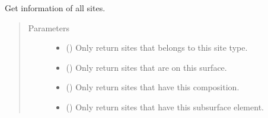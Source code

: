 \documentclass[letterpaper,10pt,english]{sphinxmanual}
\begin{document}
\begin{fulllineitems}
\begin{fulllineitems}
\begin{quote}
\begin{description}
\end{description}\end{quote}

\end{fulllineitems}


\begin{fulllineitems}
\label{\detokenize{modules:acat.adsorption_sites.SlabAdsorptionSites.get_sites}}
Get information of all sites.
\begin{quote}\begin{description}
\item[{Parameters}] \leavevmode\begin{itemize}
\item {} 
 (\sphinxstyleliteralemphasis{\sphinxupquote{, }}) \textendash{} Only return sites that belongs to this site type.

\item {} 
 (\sphinxstyleliteralemphasis{\sphinxupquote{, }}) \textendash{} Only return sites that are on this surface.

\item {} 
 (\sphinxstyleliteralemphasis{\sphinxupquote{, }}) \textendash{} Only return sites that have this composition.

\item {} 
 (\sphinxstyleliteralemphasis{\sphinxupquote{, }}) \textendash{} Only return sites that have this subsurface element.


\end{itemize}
\end{description}
\end{quote}
\end{fulllineitems}
\end{fulllineitems}
\end{document}

